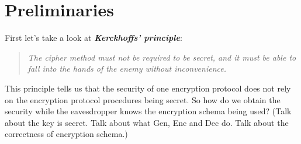 \section{Preliminaries}
First let's take a look at \textbf{\textit{Kerckhoffs’ principle}}:
\begin{quote} \textit{The cipher method must not be required to be secret, and it must be able to fall into the hands of the enemy without inconvenience.} \end{quote}
This principle tells us that the security of one encryption protocol does not rely on the encryption protocol procedures being secret. So how do we obtain the security while the eavesdropper knows the encryption schema being used? (Talk about the key is secret. Talk about what Gen, Enc and Dec do. Talk about the correctness of encryption schema.)
